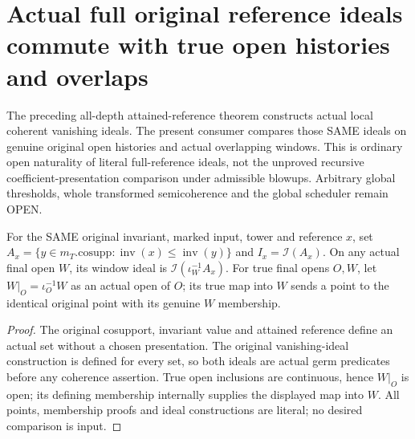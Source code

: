 \section{Actual full original reference ideals commute with true open histories and overlaps}

The preceding all-depth attained-reference theorem constructs actual local
coherent vanishing ideals. The present consumer compares those SAME ideals
on genuine original open histories and actual overlapping windows. This is
ordinary open naturality of literal full-reference ideals, not the unproved
recursive coefficient-presentation comparison under admissible blowups.
Arbitrary global thresholds, whole transformed semicoherence and the global
scheduler remain OPEN.

\begin{definition}
\label{hir:original-full-reference-literal-ideals-and-windows}
\leanok
{}
For the SAME original invariant, marked input, tower and reference $x$, set
$A_x=\{y\in m_T.\mathrm{cosupp}:\operatorname{inv}(x)\le\operatorname{inv}(y)\}$
and $I_x=\mathcal I(A_x)$. On any actual final open $W$, its window ideal is
$\mathcal I(\iota_W^{-1}A_x)$. For true final opens $O,W$, let
$W|_O=\iota_O^{-1}W$ as an actual open of $O$; its true map into $W$ sends a
point to the identical original point with its genuine $W$ membership.
\end{definition}
\begin{proof}
The original cosupport, invariant value and attained reference define an
actual set without a chosen presentation. The original vanishing-ideal
construction is defined for every set, so both ideals are actual germ
predicates before any coherence assertion. True open inclusions are
continuous, hence $W|_O$ is open; its defining membership internally supplies
the displayed map into $W$. All points, membership proofs and ideal
constructions are literal; no desired comparison is input.
\end{proof}

